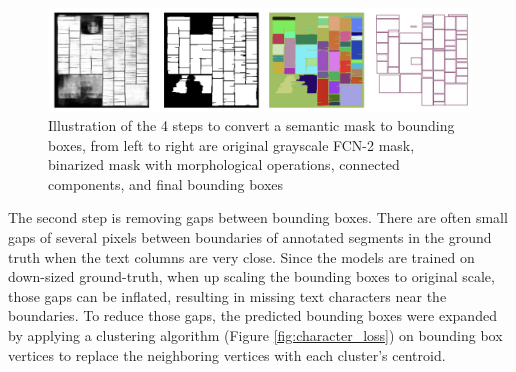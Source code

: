 \documentclass[letterpaper]{article} %
\begin{document}

 \begin{figure}[t]
   \centering
   \includegraphics[width=\linewidth]{LaTeX/Figures/mask_to_bbox.png}
   \caption{Illustration of the 4 steps to convert a semantic mask to bounding boxes, from left to right are original grayscale FCN-2 mask, binarized mask with morphological operations, connected components, and final bounding boxes}
   \label{fig:mask2bbox}
 \end{figure}
 
The second step is removing gaps between bounding boxes.
There are often small gaps of several pixels between boundaries of annotated segments in the ground truth when the text columns are very close.  Since the models are trained on down-sized ground-truth,  when up scaling the bounding boxes to original scale, those gaps can be inflated, resulting in missing text characters near the boundaries. 
To reduce those gaps, the predicted bounding boxes were expanded by applying 
a clustering algorithm (Figure \ref{fig:character_loss}) on bounding box vertices to replace the neighboring vertices with each cluster's centroid.
\end{document}
